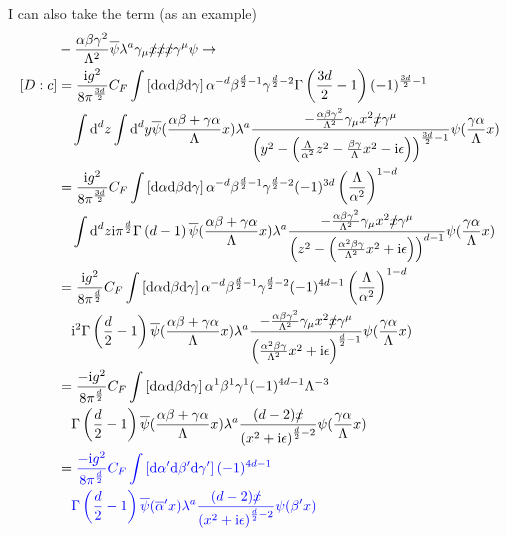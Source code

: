I can also take the term (as an example)
\begin{align}
	&-\frac{\alpha\beta\gamma^2}{\Lambda^2}\overline\psi \lambda^a \gamma_\mu \slashed x \slashed x \slashed x \gamma^\mu \psi
	\rightarrow
	\\
	\left[D:c\right]
	&=
	\frac{\text{i} g^2}{8\pi^{\frac{3d}{2}}} C_F \int\left[\text{d} \alpha \text{d} \beta \text{d} \gamma\right]\alpha^{-d}\beta^{\frac{d}{2}-1}\gamma^{\frac{d}{2}-2}\Gamma\left(\frac{3d}{2}-1\right) (-1)^{\frac{3d}{2}-1}
	\\&~~~
	\int \text{d}^d z \int \text{d}^d y \overline\psi(\frac{\alpha \beta + \gamma \alpha}{\Lambda} x) \lambda^a \frac{-\frac{\alpha\beta\gamma^2}{\Lambda^2}\gamma_\mu x^2\slashed x \gamma^\mu}{\left( y^2 - \left( \frac{\Lambda}{\alpha^2}z^2- \frac{\beta\gamma}{\Lambda}x^2-\text{i} \epsilon\right)\right)^{\frac{3d}{2}-1}}\psi(\frac{\gamma \alpha}{\Lambda} x)
	\\
	&=
	\frac{\text{i} g^2}{8\pi^{\frac{3d}{2}}} C_F \int\left[\text{d} \alpha \text{d} \beta \text{d} \gamma\right]\alpha^{-d}\beta^{\frac{d}{2}-1}\gamma^{\frac{d}{2}-2} (-1)^{3d}\left(\frac{\Lambda}{\alpha^2}\right)^{1-d}
	\\&~~~
	\int \text{d}^d z \text{i} \pi^{\frac{d}{2}}\Gamma\left(d-1\right)  \overline\psi(\frac{\alpha \beta + \gamma \alpha}{\Lambda} x) \lambda^a \frac{-\frac{\alpha\beta\gamma^2}{\Lambda^2}\gamma_\mu x^2\slashed x \gamma^\mu}{\left( z^2-\left(\frac{\alpha^2\beta\gamma}{\Lambda^2}x^2+\text{i} \epsilon\right)\right)^{d-1}}\psi(\frac{\gamma \alpha}{\Lambda} x)
	\\
	&=
	\frac{\text{i} g^2}{8\pi^{\frac{d}{2}}} C_F \int\left[\text{d} \alpha \text{d} \beta \text{d} \gamma\right]\alpha^{-d}\beta^{\frac{d}{2}-1}\gamma^{\frac{d}{2}-2} (-1)^{4d-1}\left(\frac{\Lambda}{\alpha^2}\right)^{1-d}
	\\&~~~
	\text{i}^2 \Gamma\left(\frac{d}2-1\right)  \overline\psi(\frac{\alpha \beta + \gamma \alpha}{\Lambda} x) \lambda^a \frac{-\frac{\alpha\beta\gamma^2}{\Lambda^2}\gamma_\mu x^2\slashed x \gamma^\mu}{\left(\frac{\alpha^2\beta\gamma}{\Lambda^2}x^2+\text{i} \epsilon\right)^{\frac{d}{2}-1}}\psi(\frac{\gamma \alpha}{\Lambda} x)
	\\
	&=
	\frac{-\text{i} g^2}{8\pi^{\frac{d}{2}}} C_F \int\left[\text{d} \alpha \text{d} \beta \text{d} \gamma\right]\alpha^{1}\beta^{1}\gamma^{1} (-1)^{4d-1}\Lambda^{-3}
	\\&~~~
	\Gamma\left(\frac{d}2-1\right)  \overline\psi(\frac{\alpha \beta + \gamma \alpha}{\Lambda} x) \lambda^a \frac{(d-2) \slashed x }{\left(x^2+\text{i} \epsilon\right)^{\frac{d}{2}-2}}\psi(\frac{\gamma \alpha}{\Lambda} x)
	\\
	&=
	\color{blue}
	\frac{-\text{i} g^2}{8\pi^{\frac{d}{2}}} C_F \int\left[\text{d} \alpha' \text{d} \beta' \text{d} \gamma'\right] (-1)^{4d-1}
	\\&~~~\color{blue}
	\Gamma\left(\frac{d}2-1\right)  \overline\psi(\overline\alpha' x) \lambda^a \frac{(d-2) \slashed x }{\left(x^2+\text{i} \epsilon\right)^{\frac{d}{2}-2}}\psi(\beta' x)
\end{align}

